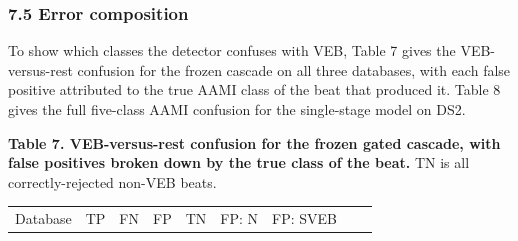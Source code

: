 \documentclass[
]{article}
\begin{document}
\subsubsection{7.5 Error composition}\label{error-composition}

To show which classes the detector confuses with VEB, Table 7 gives the
VEB-versus-rest confusion for the frozen cascade on all three databases,
with each false positive attributed to the true AAMI class of the beat
that produced it. Table 8 gives the full five-class AAMI confusion for
the single-stage model on DS2.

\textbf{Table 7. VEB-versus-rest confusion for the frozen gated cascade,
with false positives broken down by the true class of the beat.} TN is
all correctly-rejected non-VEB beats.

\begin{longtable}[]{@{}
  >{\raggedright\arraybackslash}p{}
  >{\raggedleft\arraybackslash}p{}
  >{\raggedleft\arraybackslash}p{}
  >{\raggedleft\arraybackslash}p{}
  >{\raggedleft\arraybackslash}p{}
  >{\raggedleft\arraybackslash}p{}
  >{\raggedleft\arraybackslash}p{}
  >{\raggedleft\arraybackslash}p{}
  >{\raggedleft\arraybackslash}p{}@{}}
\toprule\noalign{}
\begin{minipage}[b]{\linewidth}\raggedright
Database
\end{minipage} & \begin{minipage}[b]{\linewidth}\raggedleft
TP
\end{minipage} & \begin{minipage}[b]{\linewidth}\raggedleft
FN
\end{minipage} & \begin{minipage}[b]{\linewidth}\raggedleft
FP
\end{minipage} & \begin{minipage}[b]{\linewidth}\raggedleft
TN
\end{minipage} & \begin{minipage}[b]{\linewidth}\raggedleft
FP: N
\end{minipage} & \begin{minipage}[b]{\linewidth}\raggedleft
FP: SVEB
\end{minipage} & \begin{minipage}[b]{\linewidth}\raggedleft

\end{minipage}
\end{longtable}
\end{document}
